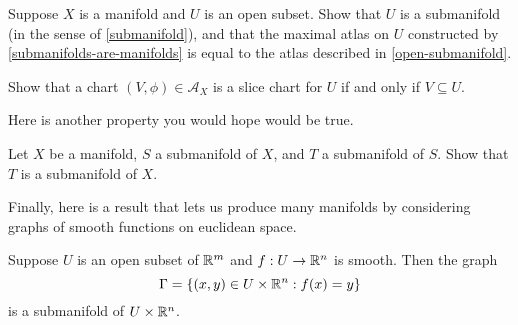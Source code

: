 \begin{exercise} \label{open-submanifolds-are-submanifolds}
	Suppose $X$ is a manifold and $U$ is an open subset. Show that $U$ is a submanifold (in the sense of \cref{submanifold}), and that the maximal atlas on $U$ constructed by \cref{submanifolds-are-manifolds} is equal to the atlas described in \cref{open-submanifold}. 
	\begin{hint}
		Show that a chart $(V, \phi) \in \mathscr{A}_X$ is a slice chart for $U$ if and only if $V \subseteq U$. 
	\end{hint}
\end{exercise}

Here is another property you would hope would be true. 

\begin{exercise}
	Let $X$ be a manifold, $S$ a submanifold of $X$, and $T$ a submanifold of $S$. Show that $T$ is a submanifold of $X$. 
\end{exercise}

Finally, here is a result that lets us produce many manifolds by considering graphs of smooth functions on euclidean space. 

\begin{proposition} \label{graphs-smooth}
	Suppose $U$ is an open subset of $\mathbb{R}^m$ and $f : U \to \mathbb{R}^n$ is smooth. Then the graph 
	\[ \Gamma = \{ (x,y) \in U \times \mathbb{R}^n : f(x) = y \} \]
	is a submanifold of $U \times \mathbb{R}^n$. 
\end{proposition}

